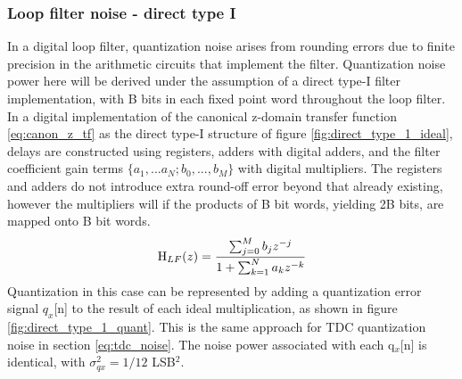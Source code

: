 	\subsubsection{Loop filter noise - direct type I}\label{lf_noise}
		In a digital loop filter, quantization noise arises from rounding errors due to finite precision in the arithmetic circuits that implement the filter. Quantization noise power here will be derived under the assumption of a direct type-I filter implementation, with B bits in each fixed point word throughout the loop filter. In a digital implementation of the canonical z-domain transfer function \ref{eq:canon_z_tf} as the direct type-I structure of figure \ref{fig:direct_type_1_ideal}, delays are constructed using registers, adders with digital adders, and the filter coefficient gain terms $\{a_1, ... a_N; b_0, ..., b_M\}$ with digital multipliers. The registers and adders do not introduce extra round-off error beyond that already existing, however the multipliers will if the products of B bit words, yielding 2B bits, are mapped onto B bit words. 
		\begin{equation}
			\textnormal{H}_{LF}(z) = \frac{\sum_{j=0}^M b_jz^{-j}}{1+\sum_{k=1}^N a_kz^{-k}}\label{eq:canon_z_tf}
		\end{equation}
		\FloatBarrier
		Quantization in this case can be represented by adding a quantization error signal $q_x$[n] to the result of each ideal multiplication, as shown in figure \ref{fig:direct_type_1_quant}. This is the same approach for TDC quantization noise in section \ref{eq:tdc_noise}. The noise power associated with each q$_x$[n] is identical, with $\sigma_{qx}^2 = 1/12$ LSB$^2$. 

